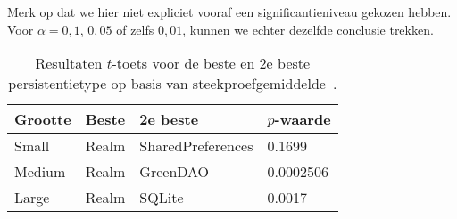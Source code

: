 Merk op dat we hier niet expliciet vooraf een significantieniveau gekozen hebben. Voor $\alpha = 0,1$, $0,05$ of zelfs $0,01$, kunnen we echter dezelfde conclusie trekken.

\begin{table}
  \begin{center}
\begin{tabular}{llll}
  \toprule
  \textbf{Grootte} & \textbf{Beste} & \textbf{2e beste} & \textbf{$p$-waarde} \\ \midrule
  Small            & Realm          & SharedPreferences & 0.1699     \\
  Medium           & Realm          & GreenDAO          & 0.0002506  \\
  Large            & Realm          & SQLite            & 0.0017     \\ \bottomrule
\end{tabular}
\end{center}
  \caption{Resultaten $t$-toets voor de beste en 2e beste persistentietype op basis van steekproefgemiddelde~\autocite{Akin2016}.}
  \label{tab:akin2016-resultaten-ttoets}
\end{table}